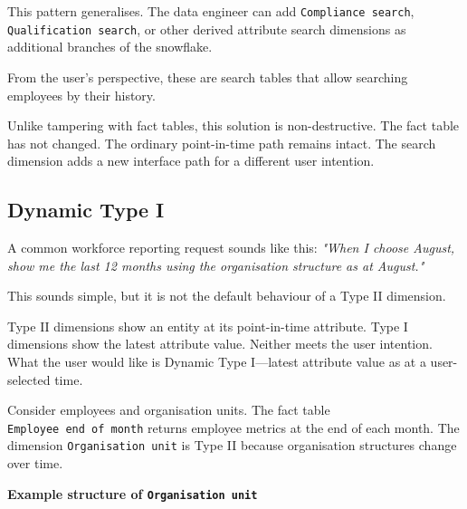 \documentclass[10pt,openany,10pt]{book}
\begin{document}
This pattern generalises. The data engineer can add
\texttt{\textquotesingle{}Compliance\ search\textquotesingle{}},
\texttt{\textquotesingle{}Qualification\ search\textquotesingle{}}, or
other derived attribute search dimensions as additional branches of the
snowflake.

From the user's perspective, these are search tables that allow
searching employees by their history.

Unlike tampering with fact tables, this solution is non-destructive. The
fact table has not changed. The ordinary point-in-time path remains
intact. The search dimension adds a new interface path for a different
user intention.

\subsection{Dynamic Type I}\label{dynamic-type-i}

A common workforce reporting request sounds like this: \emph{"When I
choose August, show me the last 12 months using the organisation
structure as at August."}

This sounds simple, but it is not the default behaviour of a Type II
dimension.

Type II dimensions show an entity at its point-in-time attribute. Type I
dimensions show the latest attribute value. Neither meets the user
intention. What the user would like is Dynamic Type I---latest attribute
value as at a user-selected time.

Consider employees and organisation units. The fact table
\texttt{\textquotesingle{}Employee\ end\ of\ month\textquotesingle{}}
returns employee metrics at the end of each month. The dimension
\texttt{\textquotesingle{}Organisation\ unit\textquotesingle{}} is Type
II because organisation structures change over time.

\textbf{Example structure of
\texttt{\textquotesingle{}Organisation\ unit\textquotesingle{}}}
\end{document}
